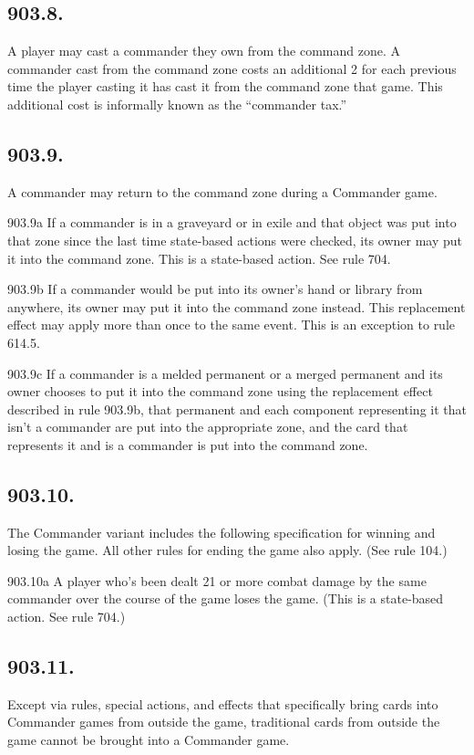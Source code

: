 \subsection*{903.8.}
A player may cast a commander they own from the command zone. A commander cast from the command zone costs an additional {2} for each previous time the player casting it has cast it from the command zone that game. This additional cost is informally known as the “commander tax.”

\subsection*{903.9.}
A commander may return to the command zone during a Commander game.

903.9a If a commander is in a graveyard or in exile and that object was put into that zone since the last time state-based actions were checked, its owner may put it into the command zone. This is a state-based action. See rule 704.

903.9b If a commander would be put into its owner’s hand or library from anywhere, its owner may put it into the command zone instead. This replacement effect may apply more than once to the same event. This is an exception to rule 614.5.

903.9c If a commander is a melded permanent or a merged permanent and its owner chooses to put it into the command zone using the replacement effect described in rule 903.9b, that permanent and each component representing it that isn’t a commander are put into the appropriate zone, and the card that represents it and is a commander is put into the command zone.

\subsection*{903.10.}
The Commander variant includes the following specification for winning and losing the game. All other rules for ending the game also apply. (See rule 104.)

903.10a A player who’s been dealt 21 or more combat damage by the same commander over the course of the game loses the game. (This is a state-based action. See rule 704.)

\subsection*{903.11.}
Except via rules, special actions, and effects that specifically bring cards into Commander games from outside the game, traditional cards from outside the game cannot be brought into a Commander game.

